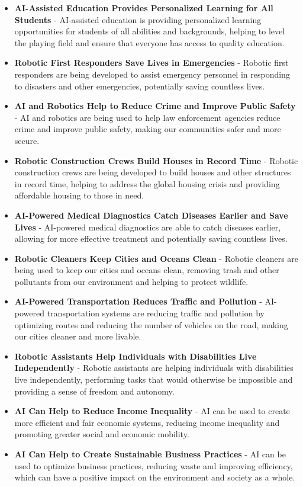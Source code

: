 \documentclass{article}
\begin{document}
\begin{itemize}
\item \textbf{AI-Assisted Education Provides Personalized Learning for All Students} - AI-assisted education is providing personalized learning opportunities for students of all abilities and backgrounds, helping to level the playing field and ensure that everyone has access to quality education.
\item \textbf{Robotic First Responders Save Lives in Emergencies} - Robotic first responders are being developed to assist emergency personnel in responding to disasters and other emergencies, potentially saving countless lives.
\item \textbf{AI and Robotics Help to Reduce Crime and Improve Public Safety} - AI and robotics are being used to help law enforcement agencies reduce crime and improve public safety, making our communities safer and more secure.
\item \textbf{Robotic Construction Crews Build Houses in Record Time} - Robotic construction crews are being developed to build houses and other structures in record time, helping to address the global housing crisis and providing affordable housing to those in need.
\item \textbf{AI-Powered Medical Diagnostics Catch Diseases Earlier and Save Lives} - AI-powered medical diagnostics are able to catch diseases earlier, allowing for more effective treatment and potentially saving countless lives.
\item \textbf{Robotic Cleaners Keep Cities and Oceans Clean} - Robotic cleaners are being used to keep our cities and oceans clean, removing trash and other pollutants from our environment and helping to protect wildlife.
\item \textbf{AI-Powered Transportation Reduces Traffic and Pollution} - AI-powered transportation systems are reducing traffic and pollution by optimizing routes and reducing the number of vehicles on the road, making our cities cleaner and more livable.
\item \textbf{Robotic Assistants Help Individuals with Disabilities Live Independently} - Robotic assistants are helping individuals with disabilities live independently, performing tasks that would otherwise be impossible and providing a sense of freedom and autonomy.
\item \textbf{AI Can Help to Reduce Income Inequality} - AI can be used to create more efficient and fair economic systems, reducing income inequality and promoting greater social and economic mobility.
\item \textbf{AI Can Help to Create Sustainable Business Practices} - AI can be used to optimize business practices, reducing waste and improving efficiency, which can have a positive impact on the environment and society as a whole.

\end{itemize}
\end{document}
